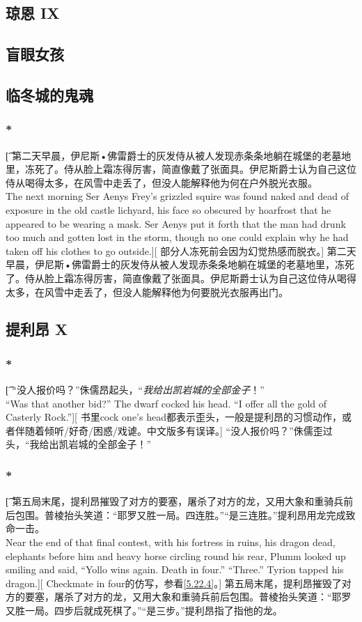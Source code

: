 \documentclass[12pt,a4paper]{article}
\begin{document}
\subsection{琼恩 IX}

\subsection{盲眼女孩}

\subsection{临冬城的鬼魂}
\subsubsection{\color{red}*}\t[
	第二天早晨，伊尼斯•佛雷爵士的灰发侍从被人发现赤条条地躺在城堡的老墓地里，冻死了。侍从脸上霜冻得厉害，简直像戴了张面具。伊尼斯爵士认为自己这位侍从喝得太多，在风雪中走丢了，但没人能解释他为何在户外脱光衣服。\\
	The next morning Ser Aenys Frey's grizzled squire was found naked and dead of exposure in the old castle lichyard, his face so obscured by hoarfrost that he appeared to be wearing a mask. Ser Aenys put it forth that the man had drunk too much and gotten lost in the storm, though no one could explain why he had taken off his clothes to go outside.][
	部分人冻死前会因为幻觉热感而脱衣。]
	第二天早晨，伊尼斯•佛雷爵士的灰发侍从被人发现赤条条地躺在城堡的老墓地里，冻死了。侍从脸上霜冻得厉害，简直像戴了张面具。伊尼斯爵士认为自己这位侍从喝得太多，在风雪中走丢了，但没人能解释他为何要脱光衣服再出门。
	
\subsection{提利昂 X}
\subsubsection{\color{red}*}\t[
	“没人报价吗？”侏儒昂起头，“\emph{我给出凯岩城的全部金子}！”\\
	“Was that another bid?” The dwarf cocked his head. “I offer all the gold of Casterly Rock.”][
	书里cock one's head都表示歪头，一般是提利昂的习惯动作，或者伴随着倾听/好奇/困惑/戏谑。中文版多有误译。]
	“没人报价吗？”侏儒歪过头，“我给出凯岩城的全部金子！”
	
\subsubsection{\color{red}*}\label{5.47.1}\t[
	第五局末尾，提利昂摧毁了对方的要塞，屠杀了对方的龙，又用大象和重骑兵前后包围。普棱抬头笑道：“耶罗又胜一局。四连胜。”“是三连胜。”提利昂用龙完成致命一击。\\
	Near the end of that final contest, with his fortress in ruins, his dragon dead, elephants before him and heavy horse circling round his rear, Plumm looked up smiling and said, “Yollo wins again. Death in four.”
	“Three.” Tyrion tapped his dragon.][
	Checkmate in four的仿写，参看\ref{5.22.4}。]
	第五局末尾，提利昂摧毁了对方的要塞，屠杀了对方的龙，又用大象和重骑兵前后包围。普棱抬头笑道：“耶罗又胜一局。四步后就成死棋了。”“是三步。”提利昂指了指他的龙。
	
\end{document}
